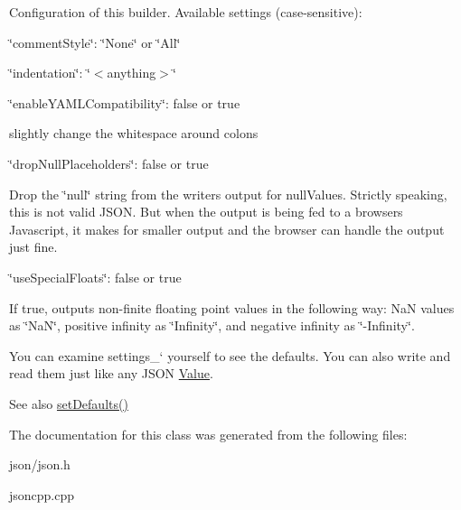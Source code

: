 Configuration of this builder. Available settings (case-\/sensitive)\+:
\begin{DoxyItemize}
\item \char`\"{}comment\+Style\char`\"{}\+: \char`\"{}\+None\char`\"{} or \char`\"{}\+All\char`\"{}
\item \char`\"{}indentation\char`\"{}\+: \char`\"{}$<$anything$>$\char`\"{}
\item \char`\"{}enable\+Y\+A\+M\+L\+Compatibility\char`\"{}\+: false or true
\begin{DoxyItemize}
\item slightly change the whitespace around colons
\end{DoxyItemize}
\item \char`\"{}drop\+Null\+Placeholders\char`\"{}\+: false or true
\begin{DoxyItemize}
\item Drop the \char`\"{}null\char`\"{} string from the writer\textquotesingle{}s output for null\+Values. Strictly speaking, this is not valid J\+S\+ON. But when the output is being fed to a browser\textquotesingle{}s Javascript, it makes for smaller output and the browser can handle the output just fine.
\end{DoxyItemize}
\item \char`\"{}use\+Special\+Floats\char`\"{}\+: false or true
\begin{DoxyItemize}
\item If true, outputs non-\/finite floating point values in the following way\+: NaN values as \char`\"{}\+Na\+N\char`\"{}, positive infinity as \char`\"{}\+Infinity\char`\"{}, and negative infinity as \char`\"{}-\/\+Infinity\char`\"{}.
\end{DoxyItemize}
\end{DoxyItemize}

You can examine \textquotesingle{}settings\+\_\+` yourself to see the defaults. You can also write and read them just like any J\+S\+ON \hyperlink{classJson_1_1Value}{Value}. \begin{DoxySeeAlso}{See also}
\hyperlink{classJson_1_1StreamWriterBuilder_a53bf106b141e28637b01ad0ecd2acbf6}{set\+Defaults()} 
\end{DoxySeeAlso}


The documentation for this class was generated from the following files\+:\begin{DoxyCompactItemize}
\item 
json/json.\+h\item 
jsoncpp.\+cpp\end{DoxyCompactItemize}
